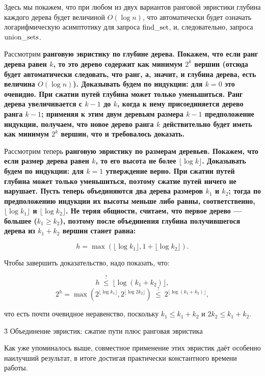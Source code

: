 Здесь мы покажем, что при любом из двух вариантов ранговой эвристики глубина каждого дерева будет величиной $O (\log n)$, что автоматически будет означать логарифмическую асимптотику для запроса $\rm find\_set$, и, следовательно, запроса $\rm union\_sets$.

Рассмотрим \bf{ранговую эвристику по глубине дерева}. Покажем, что если ранг дерева равен $k$, то это дерево содержит как минимум $2^k$ вершин (отсюда будет автоматически следовать, что ранг, а, значит, и глубина дерева, есть величина $O(\log n)$). Доказывать будем по индукции: для $k=0$ это очевидно. При сжатии путей глубина может только уменьшиться. Ранг дерева увеличивается с $k-1$ до $k$, когда к нему присоединяется дерево ранга $k-1$; применяя к этим двум деревьям размера $k-1$ предположение индукции, получаем, что новое дерево ранга $k$ действительно будет иметь как минимум $2^k$ вершин, что и требовалось доказать.

Рассмотрим теперь \bf{ранговую эвристику по размерам деревьев}. Покажем, что если размер дерева равен $k$, то его высота не более $\lfloor \log k \rfloor$. Доказывать будем по индукции: для $k=1$ утверждение верно. При сжатии путей глубина может только уменьшиться, поэтому сжатие путей ничего не нарушает. Пусть теперь объединяются два дерева размеров $k_1$ и $k_2$; тогда по предположению индукции их высоты меньше либо равны, соответственно, $\lfloor \log k_1 \rfloor$ и $\lfloor \log k_2 \rfloor$. Не теряя общности, считаем, что первое дерево --- большее ($k_1 \ge k_2$), поэтому после объединения глубина получившегося дерева из $k_1+k_2$ вершин станет равна:

$$ h = \max ( \lfloor \log k_1 \rfloor, 1 + \lfloor \log k_2 \rfloor ). $$

Чтобы завершить доказательство, надо показать, что:

$$ h ~ \stackrel{?}{\le} ~ \lfloor \log (k_1+k_2) \rfloor, $$
$$ 2^h = \max ( 2 ^ {\lfloor \log k_1 \rfloor}, 2 ^ {\lfloor \log 2 k_2 \rfloor} ) ~ \stackrel{?}{\le} ~ 2 ^ {\lfloor \log (k_1+k_2) \rfloor}, $$

что есть почти очевидное неравенство, поскольку $k_1 \le k_1+k_2$ и $2 k_2 \le k_1+k_2$.



\h3{ Объединение эвристик: сжатие пути плюс ранговая эвристика }

Как уже упоминалось выше, совместное применение этих эвристик даёт особенно наилучший результат, в итоге достигая практически константного времени работы.

